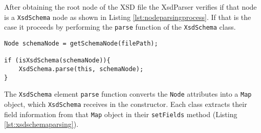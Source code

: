 \newpage

\noindent
After obtaining the root node of the \ac{XSD} file the XsdParser verifies if that node is a \texttt{XsdSchema} node as shown in Listing \ref{lst:nodeparsingprocess}. If that is the case it proceeds by performing the \texttt{parse} function of the \texttt{XsdSchema} class.  

\medskip


\begin{minipage}{\linewidth}
\begin{lstlisting}[caption={XsdParser Node Parsing Process},captionpos=b,label={lst:nodeparsingprocess}]
Node schemaNode = getSchemaNode(filePath);
            
if (isXsdSchema(schemaNode)){
    XsdSchema.parse(this, schemaNode);
}
\end{lstlisting}
\end{minipage}

\noindent
The \texttt{XsdSchema} element \texttt{parse} function converts the \texttt{Node} attributes into a \texttt{Map} object, which \texttt{XsdSchema} receives in the constructor. Each class extracts their field information from that \texttt{Map} object in their \texttt{setFields} method (Listing \ref{lst:xsdschemaparsing}). 


